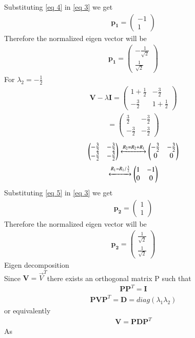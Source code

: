 \documentclass[journal,12pt,twocolumn]{IEEEtran}
\providecommand{\brak}[1]{\ensuremath{\left(#1\right)}}
\newcommand{\myvec}[1]{\ensuremath{\begin{pmatrix}#1\end{pmatrix}}}
\numberwithin{equation}{subsection}
\let\vec\mathbf
\begin{document}
Substituting \eqref{eq 4} in \eqref{eq 3} we get 
\begin{align}
   \vec{p_1}=\myvec{-1\\1}
\end{align}
Therefore the normalized eigen vector will be
\begin{align}
    \vec{p_1}=\myvec{-\frac{1}{\sqrt{2}}\\\frac{1}{\sqrt{2}}}
\end{align}
For $\lambda_2 = -\frac{1}{2} $
\begin{align}
\vec{V}-\lambda\vec{I}= \myvec{1+\frac{1}{2}&-\frac{3}{2}\\-\frac{3}{2}&1+\frac{1}{2}}
    \end{align}
    \begin{align}
 =\myvec{\frac{3}{2}&-\frac{3}{2}\\-\frac{3}{2}&-\frac{3}{2}}
    \end{align}
    \begin{align}
    \myvec{-\frac{3}{2}&-\frac{3}{2}\\-\frac{3}{2}&-\frac{3}{2}}\xleftrightarrow{R_2=R_2+R_1}\myvec{-\frac{3}{2}&-\frac{3}{2}\\ 0 &0}
\end{align}
 \begin{align}
    \xleftrightarrow{R_1=R_1/\frac{3}{2}}\myvec{1&-1\\ 0 &0}\label {eq 5}
   \end{align}
Substituting \eqref{eq 5} in \eqref{eq 3} we get 
\begin{align}
   \vec{p_2}=\myvec{1\\1}
\end{align}
Therefore the normalized eigen vector will be
\begin{align}
    \vec{p_2}=\myvec{\frac{1}{\sqrt{2}}\\\frac{1}{\sqrt{2}}}
\end{align}
Eigen decomposition\\ 
Since $\vec{V}=\Vec {V}^T$there exists an orthogonal matrix P such that
\begin{align}
    \vec{P}\vec{P}^T=\vec{I}
\end{align}
\begin{align}
    \vec{P}\vec{V}\vec{P}^T=\vec{D}= diag\brak{\lambda_1 \lambda_2}
\end{align}
or equivalently
\begin{align}
    \vec{V}= \vec{P} \vec{D} \vec{P}^T
\end{align}
As
\end{document}
